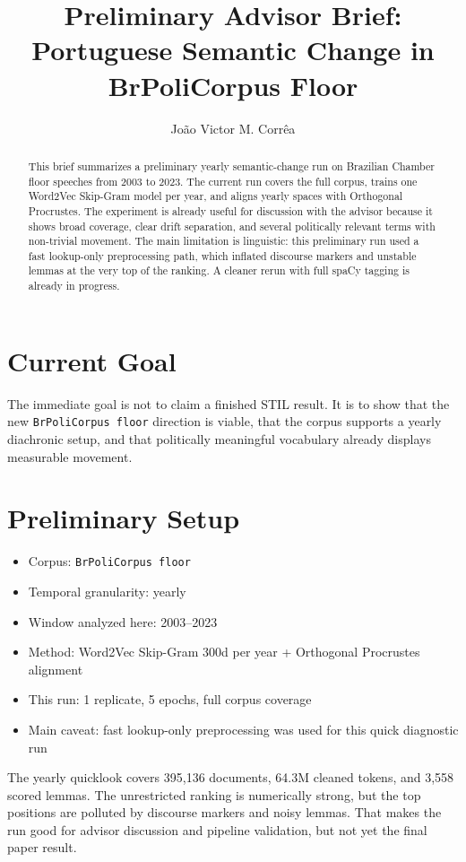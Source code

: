 \documentclass[12pt]{article}
\title{Preliminary Advisor Brief: Portuguese Semantic Change in BrPoliCorpus Floor}
\author{
Jo\~ao Victor M. Corr\^ea\inst{1}
}
\begin{document}
\maketitle

\begin{abstract}
This brief summarizes a preliminary yearly semantic-change run on Brazilian Chamber floor
speeches from 2003 to 2023. The current run covers the full corpus, trains one Word2Vec
Skip-Gram model per year, and aligns yearly spaces with Orthogonal Procrustes. The
experiment is already useful for discussion with the advisor because it shows broad coverage,
clear drift separation, and several politically relevant terms with non-trivial movement.
The main limitation is linguistic: this preliminary run used a fast lookup-only preprocessing
path, which inflated discourse markers and unstable lemmas at the very top of the ranking.
A cleaner rerun with full spaCy tagging is already in progress.
\end{abstract}

\section{Current Goal}

The immediate goal is not to claim a finished STIL result. It is to show that the new
\texttt{BrPoliCorpus floor} direction is viable, that the corpus supports a yearly diachronic
setup, and that politically meaningful vocabulary already displays measurable movement.

\section{Preliminary Setup}

\begin{itemize}
    \item Corpus: \texttt{BrPoliCorpus floor}
    \item Temporal granularity: yearly
    \item Window analyzed here: 2003--2023
    \item Method: Word2Vec Skip-Gram 300d per year + Orthogonal Procrustes alignment
    \item This run: 1 replicate, 5 epochs, full corpus coverage
    \item Main caveat: fast lookup-only preprocessing was used for this quick diagnostic run
\end{itemize}

The yearly quicklook covers 395{,}136 documents, 64.3M cleaned tokens, and 3{,}558 scored
lemmas. The unrestricted ranking is numerically strong, but the top positions are polluted by
discourse markers and noisy lemmas. That makes the run good for advisor discussion and
pipeline validation, but not yet the final paper result.
\end{document}
